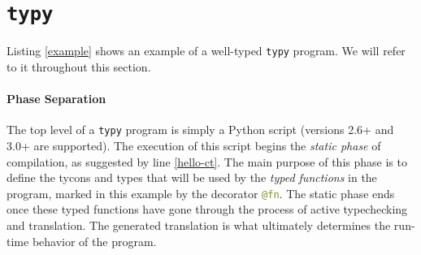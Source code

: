 \documentclass{sigplanconf}
\newcommand{\lip}[1]{\lstinline[language=Python,basicstyle=\ttfamily\small,deletendkeywords={tuple,buffer,map}]{#1}}
\begin{document}
\section{\texttt{typy}}\label{usage}


%
Listing \ref{example} shows an example of a well-typed \texttt{typy} program. We will refer to it throughout this section.

\paragraph{Phase Separation} The top level of a \texttt{typy} program is simply a Python script (versions 2.6+ and 3.0+ are supported). The execution of this script begins the \emph{static phase} of compilation, as suggested by line \ref{hello-ct}. The main purpose of this phase is to define the tycons and types that will be used by the \emph{typed functions} in the program, marked in this example by the decorator \lip{@fn}. The static phase ends once  these typed functions have gone through the process of active typechecking and translation. The generated translation is what ultimately determines the run-time behavior of the program. %

\end{document}
